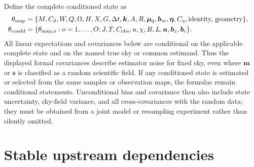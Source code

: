 \documentclass[11pt]{article}
\begin{document}
Define the complete conditioned state as
\begin{align*}
 \theta_{\rm map}&=\{M,C_d,W,Q,\Omega,H,X,G,\Delta t,\boldsymbol k,
 A,R,\boldsymbol\mu_0,\boldsymbol b_m,\boldsymbol\eta,C_\eta,
 \hbox{identity, geometry}\},\\
 \theta_{\rm coadd}&=\{\theta_{{\rm map},o}:o=1,\ldots,O;
 J,T,C_{\rm obs},u,\chi,B,L,\boldsymbol a,
 \boldsymbol b_z,\boldsymbol b_c\}.
\end{align*}
All linear expectations and covariances below are conditional on the applicable
complete state and on the named true sky or common estimand. Thus the displayed
formal covariances describe estimator noise for fixed sky, even where
\(\boldsymbol m\) or \(\boldsymbol s\) is classified as a random scientific
field. If any conditioned state is estimated or selected from the same samples
or observation maps, the formulas remain conditional statements. Unconditional
bias and covariance then also include state uncertainty, sky-field variance,
and all cross-covariances with the random data; they must be obtained from a
joint model or resampling experiment rather than silently omitted.

\clearpage
\section{Stable upstream dependencies}
\end{document}
